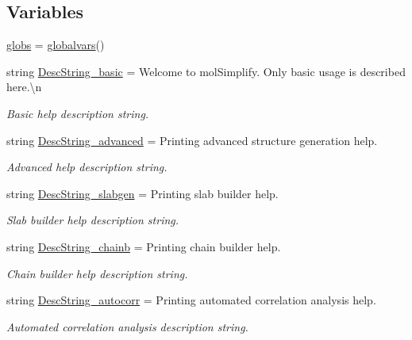 \subsection*{Variables}
\begin{DoxyCompactItemize}
\item 
\hyperlink{namespacemolSimplify_1_1____main_____a621b1b32cbc714e9bd9c879933b298e7}{globs} = \hyperlink{classmolSimplify_1_1Classes_1_1globalvars_1_1globalvars}{globalvars}()
\item 
string \hyperlink{namespacemolSimplify_1_1____main_____aa347c2a18c98b8e1a03cda9ad0ce603e}{Desc\+String\+\_\+basic} = \textquotesingle{}Welcome to mol\+Simplify. Only basic usage is described here.\textbackslash{}n\textquotesingle{}
\begin{DoxyCompactList}\small\item\em Basic help description string. \end{DoxyCompactList}\item 
string \hyperlink{namespacemolSimplify_1_1____main_____aaa9b13414a118be18409510c28ae5592}{Desc\+String\+\_\+advanced} = \textquotesingle{}Printing advanced structure generation help.\textquotesingle{}
\begin{DoxyCompactList}\small\item\em Advanced help description string. \end{DoxyCompactList}\item 
string \hyperlink{namespacemolSimplify_1_1____main_____ace71611b150d4e92bdba41429d969875}{Desc\+String\+\_\+slabgen} = \textquotesingle{}Printing slab builder help.\textquotesingle{}
\begin{DoxyCompactList}\small\item\em Slab builder help description string. \end{DoxyCompactList}\item 
string \hyperlink{namespacemolSimplify_1_1____main_____a44fcd92cdc8efbe8ae3581dfca56309c}{Desc\+String\+\_\+chainb} = \textquotesingle{}Printing chain builder help.\textquotesingle{}
\begin{DoxyCompactList}\small\item\em Chain builder help description string. \end{DoxyCompactList}\item 
string \hyperlink{namespacemolSimplify_1_1____main_____a64212e9eeef243dd712d62c9dcfe1b34}{Desc\+String\+\_\+autocorr} = \textquotesingle{}Printing automated correlation analysis help.\textquotesingle{}
\begin{DoxyCompactList}\small\item\em Automated correlation analysis description string. \end{DoxyCompactList}\item 

\end{DoxyCompactItemize}
